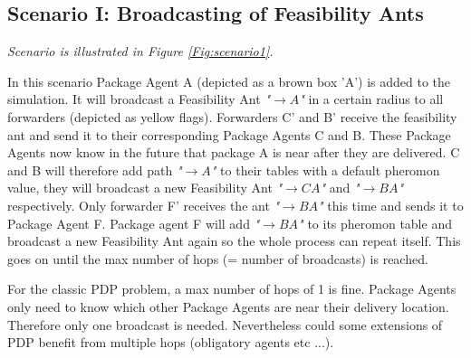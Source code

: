 \subsection*{Scenario I: Broadcasting of Feasibility Ants}
\label{subsec:scenario1}
\npar \textit{Scenario is illustrated in Figure \ref{Fig:scenario1}.}

\npar In this scenario Package Agent A (depicted as a brown box 'A') is added to the simulation. It will broadcast a Feasibility Ant \textit{"$\rightarrow A$"} in a certain radius to all forwarders (depicted as yellow flags). Forwarders C' and B' receive the feasibility ant and send it to their corresponding Package Agents C and B. These Package Agents now know in the future that package A is near after they are delivered. C and B will therefore add path \textit{"$\rightarrow A$"} to their tables with a default pheromon value, they will broadcast a new Feasibility Ant \textit{"$\rightarrow CA$"} and \textit{"$\rightarrow BA$"} respectively. Only forwarder F' receives the ant \textit{"$\rightarrow BA$"} this time and sends it to Package Agent F. Package agent F will add \textit{"$\rightarrow BA$"} to its pheromon table and broadcast a new Feasibility Ant again so the whole process can repeat itself. This goes on until the max number of hops (= number of broadcasts) is reached.

\npar For the classic PDP problem, a max number of hops of 1 is fine. Package Agents only need to know which other Package Agents are near their delivery location. Therefore only one broadcast is needed. Nevertheless could some extensions of PDP benefit from multiple hops (obligatory agents etc ...).


